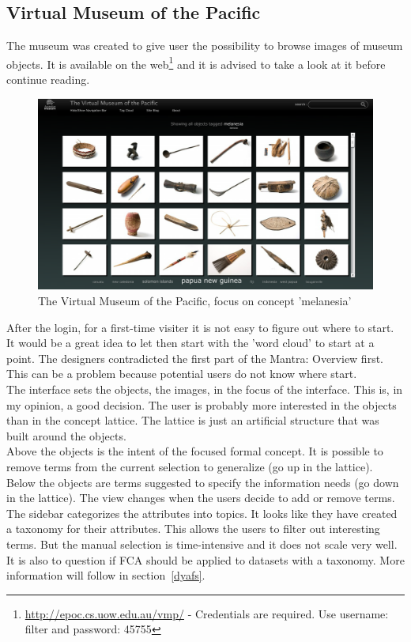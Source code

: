 \documentclass[11pt]{report}
\begin{document}
\subsection{Virtual Museum of the Pacific}
\label{Museum}
 
The museum was created to give user the possibility to browse images of museum objects. It is available on the web\footnote{\url{http://epoc.cs.uow.edu.au/vmp/} - Credentials are required. Use username: filter and password: 45755} and it is advised to take a look at it before continue reading. \\

\begin{figure}[!ht]
	\centering
	\includegraphics[width=\linewidth]{images/pacific}
\caption{The Virtual Museum of the Pacific, focus on concept 'melanesia'}
\label{figure:pacific}
\end{figure}

After the login, for a first-time visiter it is not easy to figure out where to start. It would be a great idea to let then start with the 'word cloud' to start at a point. The designers contradicted the first part of the Mantra: Overview first. This can be a problem because potential users do not know where start. \\
 
The interface sets the objects, the images, in the focus of the interface. This is, in my opinion, a good decision. The user is probably more interested in the objects than in the concept lattice. The lattice is just an artificial structure that was built around the objects. \\
 
 Above the objects is the intent of the focused formal concept. It is possible to remove terms from the current selection to generalize (go up in the lattice). Below the objects are terms suggested to specify the information needs (go down in the lattice). The view changes when the users decide to add or remove terms. The sidebar categorizes the attributes into topics. It looks like they have created a taxonomy for their attributes. This allows the users to filter out interesting terms. But the manual selection is time-intensive and it does not scale very well. It is also to question if FCA should be applied to datasets with a taxonomy. More information will follow in section~\ref{dyafs}. \\
 
\end{document}
